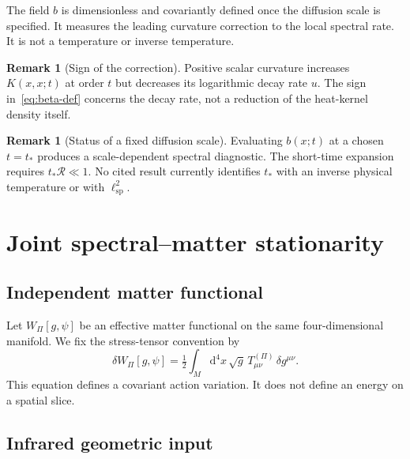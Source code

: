 \documentclass[12pt,a4paper]{article}
\theoremstyle{definition}
\newtheorem{remark}[theorem]{Remark}
\newcommand{\dd}{\mathrm{d}}
\newcommand{\half}{\tfrac{1}{2}}
\begin{document}
      The field $b$ is dimensionless and covariantly defined once the diffusion scale is specified.
      It measures the leading curvature correction to the local spectral rate.
      It is not a temperature or inverse temperature.

      \begin{remark}[Sign of the correction]
        \label{rem:sign}
        Positive scalar curvature increases $K(x,x;t)$ at order $t$ but decreases its logarithmic decay rate $u$.
        The sign in~\eqref{eq:beta-def} concerns the decay rate, not a reduction of the heat-kernel density itself.
      \end{remark}

      \begin{remark}[Status of a fixed diffusion scale]
        \label{rem:tstar}
        Evaluating $b(x;t)$ at a chosen $t=t_*$ produces a scale-dependent spectral diagnostic.
        The short-time expansion requires $t_*\mathcal{R}\ll1$.
        No cited result currently identifies $t_*$ with an inverse physical temperature or with
        $\ell_{\mathrm{sp}}^2$.
      \end{remark}

  \section{Joint spectral--matter stationarity}
    \label{sec:equilibrium}

    \subsection{Independent matter functional}

      Let $W_\Pi[g,\psi]$ be an effective matter functional on the same four-dimensional manifold.
      We fix the stress-tensor convention by
      \begin{equation}
        \delta W_\Pi[g,\psi]
        =\half\int_M\dd^4x\,\sqrt{g}\,
        T^{(\Pi)}_{\mu\nu}\,\delta g^{\mu\nu}.
        \label{eq:W-variation}
      \end{equation}
      This equation defines a covariant action variation.
      It does not define an energy on a spatial slice.

    \subsection{Infrared geometric input}
\end{document}
